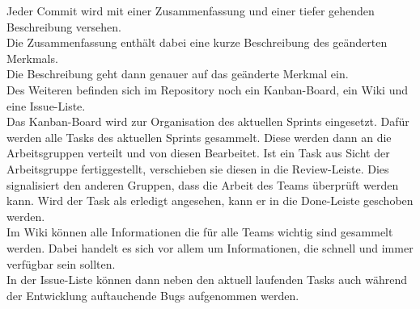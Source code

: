 Jeder Commit wird mit einer Zusammenfassung und einer tiefer gehenden Beschreibung versehen. \\
Die Zusammenfassung enthält dabei eine kurze Beschreibung des geänderten Merkmals. \\
Die Beschreibung geht dann genauer auf das geänderte Merkmal ein. \\

Des Weiteren befinden sich im Repository noch ein Kanban-Board, ein Wiki und eine Issue-Liste.\\
Das Kanban-Board wird zur Organisation des aktuellen Sprints eingesetzt. Dafür werden alle Tasks des aktuellen Sprints gesammelt. Diese werden dann an die Arbeitsgruppen verteilt und von diesen Bearbeitet. Ist ein Task aus Sicht der Arbeitsgruppe fertiggestellt, verschieben sie diesen in die Review-Leiste. Dies signalisiert den anderen Gruppen, dass die Arbeit des Teams überprüft werden kann. Wird der Task als erledigt angesehen, kann er in die Done-Leiste geschoben werden.\\

Im Wiki können alle Informationen die für alle Teams wichtig sind gesammelt werden. Dabei handelt es sich vor allem um Informationen, die schnell und immer verfügbar sein sollten.\\

In der Issue-Liste können dann neben den aktuell laufenden Tasks auch während der Entwicklung auftauchende Bugs aufgenommen werden.

